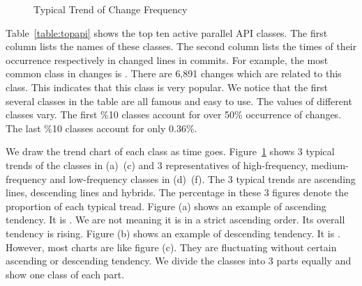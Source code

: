 \begin{figure}
	
	\caption{Typical Trend of Change Frequency}
	\label{figure:trend}
\end{figure}

Table~\ref{table:topapi} shows the top ten active parallel API classes. The first column lists the names of these classes. The second column lists the times of their occurrence respectively in changed lines in commits. For example, the most common class in changes is . There are 6,891 changes which are related to this class. This indicates that this class is very popular. We notice that the first several classes in the table are all famous and easy to use. The values of different classes vary. The first \%10 classes account for over 50\% occurrence of changes. The last \%10 classes account for only 0.36\%.

We draw the trend chart of each class as time goes. Figure~\ref{figure:trend} shows 3 typical trends of the classes in (a)~(c) and 3 representatives of high-frequency, medium-frequency and low-frequency classes in (d)~(f). The 3 typical trends are ascending lines, descending lines and hybrids. The percentage in these 3 figures denote the proportion of each typical tread. Figure (a) shows an example of ascending tendency. It is . We are not meaning it is in a strict ascending order. Its overall tendency is rising. Figure (b) shows an example of descending tendency. It is . However, most charts are like figure (c). They are fluctuating without certain ascending or descending tendency. We divide the classes into 3 parts equally and show one class of each part.

